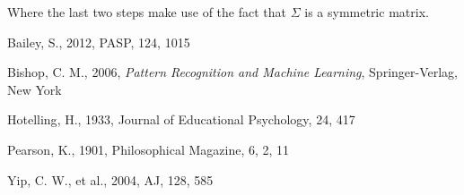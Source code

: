 \documentclass[12pt,preprint]{aastex}
\begin{document}
Where the last two steps make use of the fact that $\Sigma$ is a
symmetric matrix.


\clearpage

\begin{thebibliography}{}\raggedright

{Bailey}, S., 2012, PASP, 124, 1015

{Bishop}, C. M., 2006, \textit{Pattern Recognition and Machine
  Learning}, Springer-Verlag, New York

{Hotelling}, H., 1933, Journal of Educational Psychology, 24, 417

{Pearson}, K., 1901, Philosophical Magazine, 6, 2, 11

{Yip}, C. W., et al., 2004, AJ, 128, 585

\end{thebibliography}

\clearpage
\end{document}
